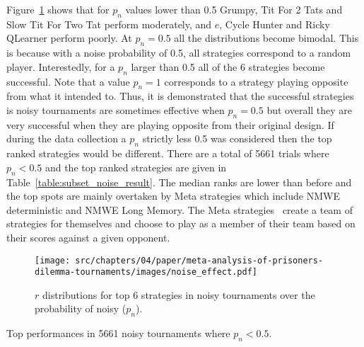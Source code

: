 Figure~\ref{fig:effect_of_noise} shows that for \(p_n\) values lower than 0.5
Grumpy, Tit For 2 Tats and Slow Tit For Two Tat perform moderately, and \(e\),
Cycle Hunter and Ricky QLearner perform poorly. At \(p_n=0.5\) all the
distributions become bimodal. This is because with a noise probability of 0.5,
all strategies correspond to a random player. Interestedly, for a \(p_n\) larger
than 0.5 all of the 6 strategies become successful. Note that a value \(p_n=1\)
corresponds to a strategy playing opposite from what it intended to. Thus, it is
demonstrated that the successful strategies is noisy tournaments are sometimes
effective when \(p_n=0.5\) but overall they are very successful when they are
playing opposite from their original design. If during the data collection a
\(p_n\) strictly less 0.5 was considered then the top ranked strategies would be
different. There are a total of 5661 trials where \(p_n<0.5\) and the top ranked
strategies are given in Table~\ref{table:subset_noise_result}. The median ranks
are lower than before and the top spots are mainly overtaken by Meta strategies
which include NMWE deterministic and NMWE Long Memory. The Meta
strategies~\cite{axelrodproject} create a team of strategies for themselves and
choose to play as a member of their team based on their scores against a given
opponent.

\begin{figure}[!htbp]
    \centering
    \texttt{[image: src/chapters/04/paper/meta-analysis-of-prisoners-dilemma-tournaments/images/noise\_effect.pdf]}
    \caption{\(r\) distributions for top 6 strategies in noisy tournaments over
    the probability of noisy ($p_n$).}
    \label{fig:effect_of_noise}
\end{figure}

\begin{table}[!htbp]
    \centering
    \resizebox{.30\textwidth}{!}{
    }
    \caption{Top performances in 5661 noisy tournaments where \(p_n<0.5\).}\label{table:subset_noise_result}
\end{table}

